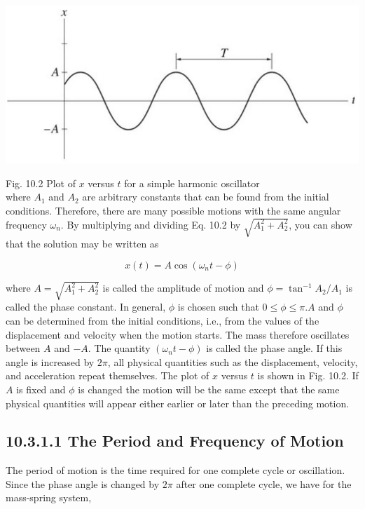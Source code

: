 \documentclass[10pt]{article}
\begin{document}
\begin{center}
\includegraphics[max width=\textwidth]{2024_09_13_db1f357d2aad0a03eb2eg-163}
\end{center}

Fig. 10.2 Plot of $x$ versus $t$ for a simple harmonic oscillator\\
where $A_{1}$ and $A_{2}$ are arbitrary constants that can be found from the initial conditions. Therefore, there are many possible motions with the same angular frequency $\omega_{n}$. By multiplying and dividing Eq. 10.2 by $\sqrt{A_{1}^{2}+A_{2}^{2}}$, you can show that the solution may be written as


\begin{equation*}
x(t)=A \cos \left(\omega_{n} t-\phi\right) \tag{10.3}
\end{equation*}


where $A=\sqrt{A_{1}^{2}+A_{2}^{2}}$ is called the amplitude of motion and $\phi=\tan ^{-1} A_{2} / A_{1}$ is called the phase constant. In general, $\phi$ is chosen such that $0 \leq \phi \leq \pi . A$ and $\phi$ can be determined from the initial conditions, i.e., from the values of the displacement and velocity when the motion starts. The mass therefore oscillates between $A$ and $-A$. The quantity $\left(\omega_{n} t-\phi\right)$ is called the phase angle. If this angle is increased by $2 \pi$, all physical quantities such as the displacement, velocity, and acceleration repeat themselves. The plot of $x$ versus $t$ is shown in Fig. 10.2. If $A$ is fixed and $\phi$ is changed the motion will be the same except that the same physical quantities will appear either earlier or later than the preceding motion.

\subsection*{10.3.1.1 The Period and Frequency of Motion}
The period of motion is the time required for one complete cycle or oscillation. Since the phase angle is changed by $2 \pi$ after one complete cycle, we have for the mass-spring system,
\end{document}
